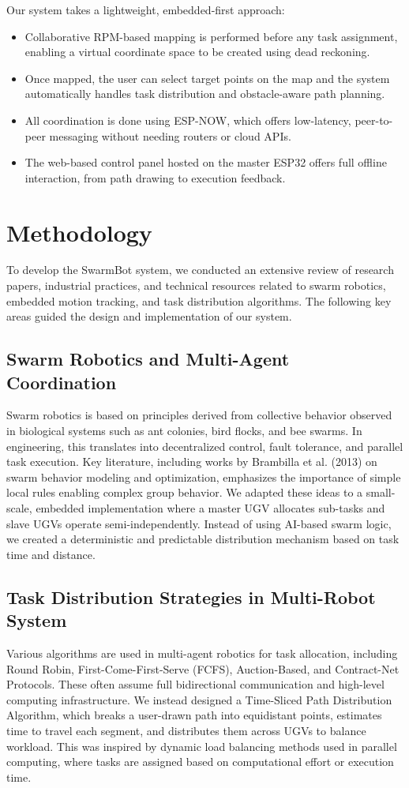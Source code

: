 \documentclass[a4paper,12pt]{report}
\begin{document}
Our system takes a lightweight, embedded-first approach:
\begin{itemize}
    \item Collaborative RPM-based mapping is performed before any task assignment, enabling a virtual coordinate space to be created using dead reckoning.
    \item Once mapped, the user can select target points on the map and the system automatically handles task distribution and obstacle-aware path planning.
    \item All coordination is done using ESP-NOW, which offers low-latency, peer-to-peer messaging without needing routers or cloud APIs.
    \item The web-based control panel hosted on the master ESP32 offers full offline interaction, from path drawing to execution feedback.
\end{itemize}


\chapter{Methodology}
 To develop the SwarmBot system, we conducted an extensive review of research papers,
 industrial practices, and technical resources related to swarm robotics, embedded motion
 tracking, and task distribution algorithms. The following key areas guided the design and
 implementation of our system.
\section{Swarm Robotics and Multi-Agent Coordination}
 Swarm robotics is based on principles derived from collective behavior observed in biological
 systems such as ant colonies, bird flocks, and bee swarms. In engineering, this translates into
 decentralized control, fault tolerance, and parallel task execution. Key literature, including
 works by Brambilla et al. (2013) on swarm behavior modeling and optimization, emphasizes
 the importance of simple local rules enabling complex group behavior.
 We adapted these ideas to a small-scale, embedded implementation where a master UGV
 allocates sub-tasks and slave UGVs operate semi-independently. Instead of using AI-based
 swarm logic, we created a deterministic and predictable distribution mechanism based on task
 time and distance.
\section{Task Distribution Strategies in Multi-Robot System}
 Various algorithms are used in multi-agent robotics for task allocation, including Round
Robin, First-Come-First-Serve (FCFS), Auction-Based, and Contract-Net Protocols. These
 often assume full bidirectional communication and high-level computing infrastructure.
 We instead designed a Time-Sliced Path Distribution Algorithm, which breaks a user-drawn
 path into equidistant points, estimates time to travel each segment, and distributes them
 across UGVs to balance workload. This was inspired by dynamic load balancing methods
 used in parallel computing, where tasks are assigned based on computational effort or
 execution time.
\end{document}
